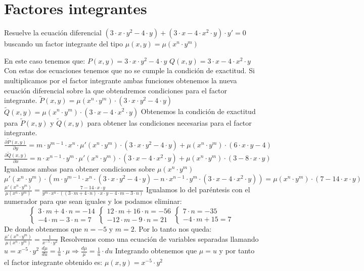
\section{Factores integrantes}
\begin{ejer}
	Resuelve la ecuación diferencial $(3\cdot x\cdot y^2 - 4\cdot y) + (3\cdot x - 4\cdot x^2\cdot y)\cdot y' = 0$  buscando un factor integrante del tipo $\mu (x,y) = \mu (x^n\cdot y^m)$
\end{ejer}
\begin{sol}
	En este caso tenemos que:  
	$P(x,y) = 3\cdot x\cdot y^2 - 4\cdot y$  
	$Q(x,y) = 3\cdot x - 4\cdot x^2\cdot y$  
	Con estas dos ecuaciones tenemos que no se cumple la condición de exactitud. Si multiplicamos por el factor integrante ambas funciones obtenemos la nueva ecuación diferencial sobre la que obtendremos condiciones para el factor integrante.  
	$\tilde{P}(x,y) = \mu (x^n\cdot y^m)\cdot (3\cdot x\cdot y^2 - 4\cdot y)$  
	$\tilde{Q}(x,y) = \mu (x^n\cdot y^m)\cdot (3\cdot x - 4\cdot x^2\cdot y)$  
	Obtenemos la condición de exactitud para $\tilde{P}(x,y)$ y $\tilde{Q}(x,y)$ para obtener las condiciones necesarias para el factor integrante.  
	$\frac{\partial \tilde{P}(x,y)}{\partial y} = m\cdot y^{m-1}\cdot x^n\cdot \mu '(x^n\cdot y^m)\cdot (3\cdot x\cdot y^2-4\cdot y) + \mu (x^n\cdot y^m)\cdot (6\cdot x\cdot y - 4)$  
	$\frac{\partial \tilde{Q}(x,y)}{\partial x} = n\cdot x^{n-1}\cdot y^m\cdot \mu '(x^n\cdot y^m)\cdot (3\cdot x - 4\cdot x^2\cdot y) + \mu (x^n\cdot y^m)\cdot (3-8\cdot x\cdot y)$  
	Igualamos ambas para obtener condiciones sobre $\mu (x^n\cdot y^m)$  
	$\mu '(x^n\cdot y^m)\cdot (m\cdot y^{m-1}\cdot x^n\cdot (3\cdot x\cdot y^2 - 4\cdot y)-n\cdot x^{n-1}\cdot y^m\cdot (3\cdot x - 4\cdot x^2\cdot y)) = \mu (x^n\cdot y^m)\cdot (7-14\cdot x\cdot y)$   
	$\frac{\mu '(x^n\cdot y^m)}{\mu (x^n\cdot y^m)} = \frac{7-14\cdot x\cdot y}{y^m\cdot x^n\cdot((3\cdot m + 4\cdot n)\cdot x\cdot y - 4\cdot m - 3\cdot n)}$  
	Igualamos lo del paréntesis con el numerador para que sean iguales y los podamos eliminar:  
	$$
	\begin{cases}
	3\cdot m + 4\cdot n = -14 \\
	-4\cdot m - 3\cdot n = 7
	\end{cases}
	\begin{cases}
	12\cdot m + 16\cdot n = -56 \\
	-12\cdot m - 9\cdot n = 21
	\end{cases}
	\begin{cases}
	7\cdot n = -35 \\
	-4\cdot m  +15 = 7
	\end{cases}
	$$
	De donde obtenemos que $n=-5$ y $m=2$. Por lo tanto nos queda:  
	$\frac{\mu '(x^n\cdot y^m)}{\mu (x^n\cdot y^m)} = \frac{1}{x^{-5}\cdot y^2}$  
	Resolvemos como una ecuación de variables separadas llamando $u = x^{-5}\cdot y^2$  
	$\frac{d\mu}{du} = \frac{1}{u}\cdot \mu \Rightarrow \frac{d\mu}{\mu} = \frac{1}{u}\cdot du$  
	Integrando obtenemos que $\mu  = u$ y por tanto el factor integrante obtenido es:  
	$\mu (x,y) = x^{-5}\cdot y^2$
\end{sol}

